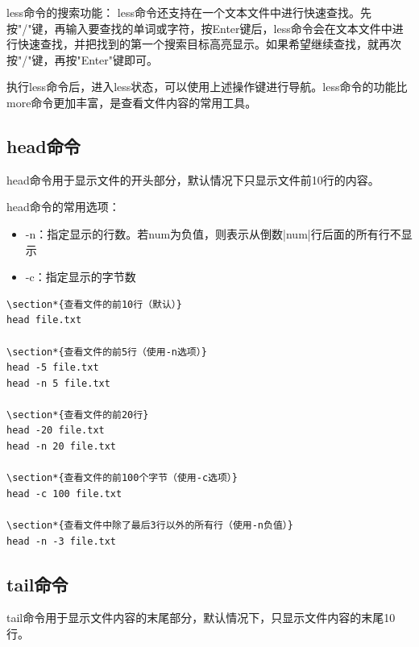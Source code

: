 \documentclass[12pt,UTF8]{ctexbook}
\begin{document}
less命令的搜索功能：
less命令还支持在一个文本文件中进行快速查找。先按"/"键，再输入要查找的单词或字符，按Enter键后，less命令会在文本文件中进行快速查找，并把找到的第一个搜索目标高亮显示。如果希望继续查找，就再次按"/"键，再按"Enter"键即可。

执行less命令后，进入less状态，可以使用上述操作键进行导航。less命令的功能比more命令更加丰富，是查看文件内容的常用工具。

\subsection{head命令}
head命令用于显示文件的开头部分，默认情况下只显示文件前10行的内容。

head命令的常用选项：
\begin{itemize}
    \item -n：指定显示的行数。若num为负值，则表示从倒数|num|行后面的所有行不显示
    \item -c：指定显示的字节数
\end{itemize}

\begin{verbatim}
\section*{查看文件的前10行（默认）}
head file.txt

\section*{查看文件的前5行（使用-n选项）}
head -5 file.txt
head -n 5 file.txt

\section*{查看文件的前20行}
head -20 file.txt
head -n 20 file.txt

\section*{查看文件的前100个字节（使用-c选项）}
head -c 100 file.txt

\section*{查看文件中除了最后3行以外的所有行（使用-n负值）}
head -n -3 file.txt
\end{verbatim}

\subsection{tail命令}
tail命令用于显示文件内容的末尾部分，默认情况下，只显示文件内容的末尾10行。
\end{document}
